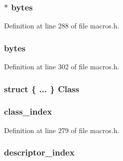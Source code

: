 \subsubsection[{bytes}]{$\ast$ bytes}\label{structcp__info_ac6ab0ef16fce28e02466e662e10f4acc}


Definition at line 288 of file macros.\+h.

\hypertarget{structcp__info_a97a61703bfa9c32f2cfa2709825b67ee}{}
\subsubsection[{bytes}]{ bytes}\label{structcp__info_a97a61703bfa9c32f2cfa2709825b67ee}


Definition at line 302 of file macros.\+h.

\hypertarget{structcp__info_a11b5ecef63a5c97db3b2f4c0596c4661}{}
\subsubsection[{Class}]{\setlength{\rightskip}{0pt plus 5cm}struct \{ ... \}   Class}\label{structcp__info_a11b5ecef63a5c97db3b2f4c0596c4661}
\hypertarget{structcp__info_a6004155348b07eae6cb68d413191efe9}{}
\subsubsection[{class\+\_\+index}]{ class\+\_\+index}\label{structcp__info_a6004155348b07eae6cb68d413191efe9}


Definition at line 279 of file macros.\+h.

\hypertarget{structcp__info_a3f13794b6c8b4ffc87b87a7c01a69060}{}
\subsubsection[{descriptor\+\_\+index}]{ descriptor\+\_\+index}\label{structcp__info_a3f13794b6c8b4ffc87b87a7c01a69060}


